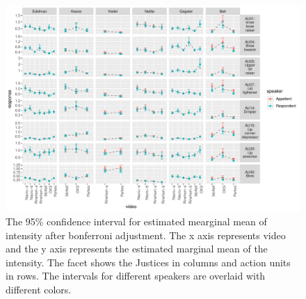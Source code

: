 \documentclass{monashthesis}
\begin{document}
\begin{figure}

{\centering \includegraphics[width=1\linewidth]{figures/intensity-speaker-1} 

}

\caption{The 95\% confidence interval for estimated mearginal mean of intensity after bonferroni adjustment. The x axis represents video and the y axis represents the estimated marginal mean of the intensity. The facet shows the Justices in columns and action units in rows. The intervals for different speakers are overlaid with different colors.}\label{fig:intensity-speaker}
\end{figure}

\printbibliography[heading=bibintoc]

\appendix
\end{document}

